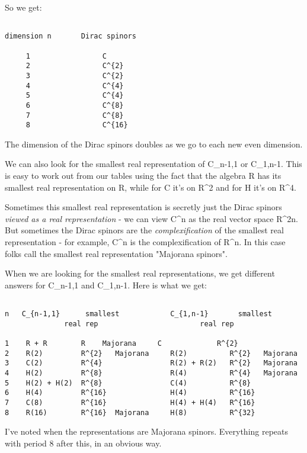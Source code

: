 So we get:


\begin{verbatim}

dimension n       Dirac spinors 

     1                 C
     2                 C^{2}
     3                 C^{2}
     4                 C^{4}
     5                 C^{4}
     6                 C^{8}
     7                 C^{8}
     8                 C^{16}

\end{verbatim}
    
The dimension of the Dirac spinors doubles as we go to each new
even dimension.

We can also look for the smallest real representation of C_{n-1,1}
or C_{1,n-1}.  This is easy to work out from our tables using
the fact that the algebra R has its smallest real representation 
on R, while for C it's on R^{2} and for H it's on R^{4}.  

Sometimes this smallest real representation is secretly just the 
Dirac spinors \emph{viewed as a real representation} - we can view C^{n}
as the real vector space R^{2n}.   But sometimes the Dirac spinors 
are the \emph{complexification} of the smallest real representation -
for example, C^{n} is the complexification of R^{n}.   In this
case folks call the smallest real representation "Majorana spinors". 

When we are looking for the smallest real representations, we get 
different answers for C_{n-1,1} and C_{1,n-1}.  
Here is what we get:


\begin{verbatim}

n   C_{n-1,1}      smallest            C_{1,n-1}       smallest 
              real rep                        real rep 

1    R + R        R    Majorana     C             R^{2}    
2    R(2)         R^{2}   Majorana     R(2)          R^{2}   Majorana
3    C(2)         R^{4}                R(2) + R(2)   R^{2}   Majorana
4    H(2)         R^{8}                R(4)          R^{4}   Majorana  
5    H(2) + H(2)  R^{8}                C(4)          R^{8} 
6    H(4)         R^{16}               H(4)          R^{16}  
7    C(8)         R^{16}               H(4) + H(4)   R^{16}  
8    R(16)        R^{16}  Majorana     H(8)          R^{32}

\end{verbatim}
    
I've noted when the representations are Majorana spinors.  Everything
repeats with period 8 after this, in an obvious way.

